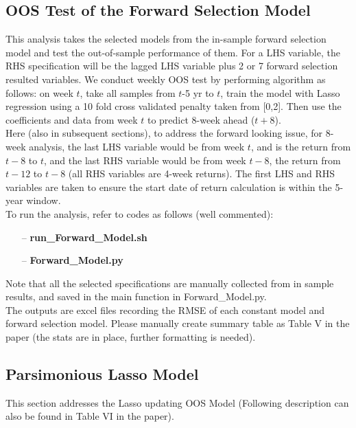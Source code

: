\documentclass[11pt]{article}
\begin{document}
\subsection{OOS Test of the Forward Selection Model}
This analysis takes the selected models from the in-sample forward selection model and test the out-of-sample performance of them. For a LHS variable, the RHS specification will be the lagged LHS variable plus 2 or 7 forward selection resulted variables. We conduct weekly OOS test by performing algorithm as follows: on week $t$, take all samples from $t$-5 yr to $t$, train the model with Lasso regression using a 10 fold cross validated penalty taken from [0,2]. Then use the coefficients and data from week $t$ to predict 8-week ahead ($t+8$).\\

Here (also in subsequent sections), to address the forward looking issue, for 8-week analysis, the last LHS variable would be from week $t$, and is the return from $t-8$ to $t$, and the last RHS variable would be from week $t-8$, the return from $t-12$ to $t-8$ (all RHS variables are 4-week returns). The first LHS and RHS variables are taken to ensure the start date of return calculation is within the 5-year window. \\

To run the analysis, refer to codes as follows (well commented):
\begin{enumerate}
	\item[--] \textbf{run\_Forward\_Model.sh}
	\item[--] \textbf{Forward\_Model.py}
\end{enumerate}

Note that all the selected specifications are manually collected from in sample results, and saved in the main function in Forward\_Model.py.\\

The outputs are excel files recording the RMSE of each constant model and forward selection model. Please manually create summary table as Table V in the paper (the stats are in place, further formatting is needed).

\subsection{Parsimonious Lasso Model}
This section addresses the Lasso updating OOS Model (Following description can also be found in Table VI in the paper). \\
\end{document}
